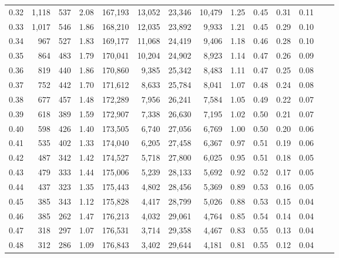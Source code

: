 \begin{tabular}{rrrrrrrrrrrrrr}
0.32 &   1,118 &    537 &    2.08 &  167,193 &   13,052 &  23,346 &  10,479 &  1.25 &  0.45 &  0.31 &      0.11 \\
0.33 &   1,017 &    546 &    1.86 &  168,210 &   12,035 &  23,892 &   9,933 &  1.21 &  0.45 &  0.29 &      0.10 \\
0.34 &     967 &    527 &    1.83 &  169,177 &   11,068 &  24,419 &   9,406 &  1.18 &  0.46 &  0.28 &      0.10 \\
0.35 &     864 &    483 &    1.79 &  170,041 &   10,204 &  24,902 &   8,923 &  1.14 &  0.47 &  0.26 &      0.09 \\
0.36 &     819 &    440 &    1.86 &  170,860 &    9,385 &  25,342 &   8,483 &  1.11 &  0.47 &  0.25 &      0.08 \\
0.37 &     752 &    442 &    1.70 &  171,612 &    8,633 &  25,784 &   8,041 &  1.07 &  0.48 &  0.24 &      0.08 \\
0.38 &     677 &    457 &    1.48 &  172,289 &    7,956 &  26,241 &   7,584 &  1.05 &  0.49 &  0.22 &      0.07 \\
0.39 &     618 &    389 &    1.59 &  172,907 &    7,338 &  26,630 &   7,195 &  1.02 &  0.50 &  0.21 &      0.07 \\
0.40 &     598 &    426 &    1.40 &  173,505 &    6,740 &  27,056 &   6,769 &  1.00 &  0.50 &  0.20 &      0.06 \\
0.41 &     535 &    402 &    1.33 &  174,040 &    6,205 &  27,458 &   6,367 &  0.97 &  0.51 &  0.19 &      0.06 \\
0.42 &     487 &    342 &    1.42 &  174,527 &    5,718 &  27,800 &   6,025 &  0.95 &  0.51 &  0.18 &      0.05 \\
0.43 &     479 &    333 &    1.44 &  175,006 &    5,239 &  28,133 &   5,692 &  0.92 &  0.52 &  0.17 &      0.05 \\
0.44 &     437 &    323 &    1.35 &  175,443 &    4,802 &  28,456 &   5,369 &  0.89 &  0.53 &  0.16 &      0.05 \\
0.45 &     385 &    343 &    1.12 &  175,828 &    4,417 &  28,799 &   5,026 &  0.88 &  0.53 &  0.15 &      0.04 \\
0.46 &     385 &    262 &    1.47 &  176,213 &    4,032 &  29,061 &   4,764 &  0.85 &  0.54 &  0.14 &      0.04 \\
0.47 &     318 &    297 &    1.07 &  176,531 &    3,714 &  29,358 &   4,467 &  0.83 &  0.55 &  0.13 &      0.04 \\
0.48 &     312 &    286 &    1.09 &  176,843 &    3,402 &  29,644 &   4,181 &  0.81 &  0.55 &  0.12 &      0.04 \\

\end{tabular}
